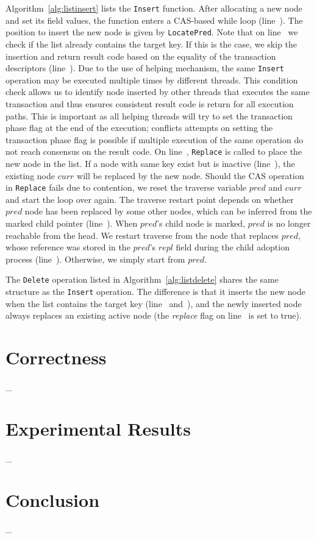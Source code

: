 \documentclass[10pt,conference,compsocconf]{IEEEtran}
\begin{document}
Algorithm~\ref{alg:listinsert} lists the \texttt{Insert} function.
After allocating a new node and set its field values, the function enters a CAS-based while loop (line~).
The position to insert the new node is given by \texttt{LocatePred}.
Note that on line~ we check if the list already contains the target key.
If this is the case, we skip the insertion and return result code based on the equality of the transaction descriptors (line~).
Due to the use of helping mechanism, the same \texttt{Insert} operation may be executed multiple times by different threads.
This condition check allows us to identify node inserted by other threads that executes the same transaction and thus ensures consistent result code is return for all execution paths.
This is important as all helping threads will try to set the transaction phase flag at the end of the execution; conflicts attempts on setting the transaction phase flag is possible if multiple execution of the same operation do not reach consensus on the result code.
On line~, \texttt{Replace} is called to place the new node in the list.
If a node with same key exist but is inactive (line~), the existing node $curr$ will be replaced by the new node.
Should the CAS operation in \texttt{Replace} fails due to contention, we reset the traverse variable $pred$ and $curr$ and start the loop over again.
The traverse restart point depends on whether $pred$ node has been replaced by some other nodes, which can be inferred from the marked child pointer (line~).
When $pred$'s child node is marked, $pred$ is no longer reachable from the head.
We restart traverse from the node that replaces $pred$, whose reference was stored in the $pred$'s $repl$ field during the child adoption process (line~).
Otherwise, we simply start from $pred$.

The \texttt{Delete} operation listed in Algorithm~\ref{alg:listdelete} shares the same structure as the \texttt{Insert} operation.
The difference is that it inserts the new node when the list contains the target key (line~ and~), and the newly inserted node always replaces an existing active node (the \textit{replace} flag on line~ is set to true).

\section{Correctness}
\label{sec:correctness}
\_

\section{Experimental Results}
\label{sec:experiment}
\_

\section{Conclusion}
\label{sec:conclusion}
\_




\end{document}

